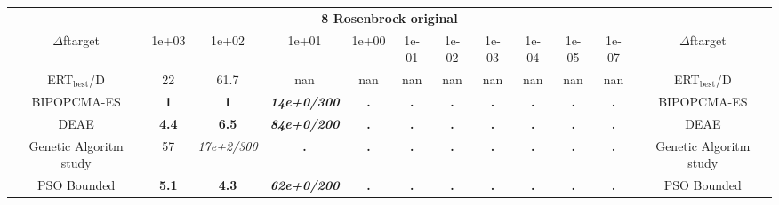 \begin{tabular}{cccccccccccc}
 & \multicolumn{10}{c}{{\normalsize \textbf{8 Rosenbrock original}}}\\
$\Delta$ftarget& 1e+03& 1e+02& 1e+01& 1e+00& 1e-01& 1e-02& 1e-03& 1e-04& 1e-05& 1e-07 & $\Delta$ftarget \\
ERT$_{\textrm{best}}$/D& 22& 61.7& nan& nan& nan& nan& nan& nan& nan& nan & ERT$_{\textrm{best}}$/D \\
\hline
BIPOPCMA-ES & \textbf{1} & \textbf{1} & \textbf{\textit{14e+0}\textit{/300}} & \textbf{.} & \textbf{.} & \textbf{.} & \textbf{.} & \textbf{.} & \textbf{.} & \textbf{.} & BIPOPCMA-ES \cite{add_an_entry_for_BIPOPCMA-ES_in_bbob.bib}\\
DEAE & \textbf{4.4} & \textbf{6.5} & \textbf{\textit{84e+0}\textit{/200}} & \textbf{.} & \textbf{.} & \textbf{.} & \textbf{.} & \textbf{.} & \textbf{.} & \textbf{.} & DEAE \cite{add_an_entry_for_DEAE_in_bbob.bib}\\
Genetic Algoritm study & 57 & \textit{17e+2}\textit{/300} & \textbf{.} & \textbf{.} & \textbf{.} & \textbf{.} & \textbf{.} & \textbf{.} & \textbf{.} & \textbf{.} & Genetic Algoritm study \cite{add_an_entry_for_Genetic Algoritm study_in_bbob.bib}\\
PSO Bounded & \textbf{5.1} & \textbf{4.3} & \textbf{\textit{62e+0}\textit{/200}} & \textbf{.} & \textbf{.} & \textbf{.} & \textbf{.} & \textbf{.} & \textbf{.} & \textbf{.} & PSO Bounded \cite{add_an_entry_for_PSO Bounded_in_bbob.bib}
\end{tabular}
